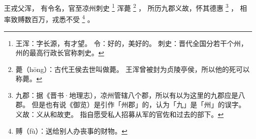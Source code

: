 
\switchcolumn*[\section{}]

王戎父浑，
有令名，官至凉州刺史%
\footnote{%
    王浑：字长源，有才望。
    令：好的，美好的。
    刺史：晋代全国分若干个州，州的最高行政长官称刺史。
}%
浑薨%
\footnote{%
    薨（hōng）：古代王侯去世叫做薨。
                王浑曾被封为贞陵亭侯，所以他的死可以称薨。
}%
，
所历九郡义故，怀其德惠%
\footnote{%
    九郡：据《晋书·地理志），凉州管辖八个郡，所以有以为这里的九郡应是八郡。
          但是也有说《御览）是引作「州郡」的，认为「九」是「州」的误字。
    义故：义从和故吏。
          指自愿受私人招募从军的官佐和过去的部下。
}%
，
相率致赙数百万，戎悉不受%
\footnote{%
    赙（fù）：送给别人办丧事的财物。
}%
。

\switchcolumn



